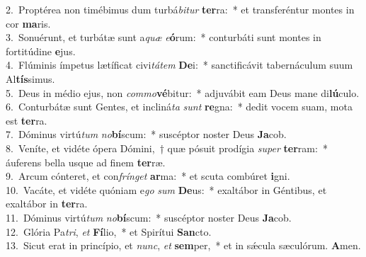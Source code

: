 {2.~}Proptérea non timébimus dum turbá\textit{bi}\textit{tur} \textbf{ter}ra:~* et transferéntur montes in cor \textbf{ma}ris.\\
{3.~}Sonuérunt, et turbátæ sunt a\textit{quæ} \textit{e}\textbf{ó}rum:~* conturbáti sunt montes in fortitúdine \textbf{e}jus.\\
{4.~}Flúminis ímpetus lætíficat civi\textit{tá}\textit{tem} \textbf{De}i:~* sanctificávit tabernáculum suum Al\textbf{tís}simus.\\
{5.~}Deus in médio ejus, non \textit{com}\textit{mo}\textbf{vé}bitur:~* adjuvábit eam Deus mane di\textbf{lú}culo.\\
{6.~}Conturbátæ sunt Gentes, et incliná\textit{ta} \textit{sunt} \textbf{re}gna:~* dedit vocem suam, mota est \textbf{ter}ra.\\
{7.~}Dóminus virtú\textit{tum} \textit{no}\textbf{bí}scum:~* suscéptor noster Deus \textbf{Ja}cob.\\
{8.~}Veníte, et vidéte ópera Dómini,~† quæ pósuit prodígia \textit{su}\textit{per} \textbf{ter}ram:~* áuferens bella usque ad finem \textbf{ter}ræ.\\
{9.~}Arcum cónteret, et con\textit{frín}\textit{get} \textbf{ar}ma:~* et scuta combúret \textbf{i}gni.\\
{10.~}Vacáte, et vidéte quóniam e\textit{go} \textit{sum} \textbf{De}us:~* exaltábor in Géntibus, et exaltábor in \textbf{ter}ra.\\
{11.~}Dóminus virtú\textit{tum} \textit{no}\textbf{bí}scum:~* suscéptor noster Deus \textbf{Ja}cob.\\
{12.~}Glória Pa\textit{tri}, \textit{et} \textbf{Fí}lio,~* et Spirítui \textbf{San}cto.\\
{13.~}Sicut erat in princípio, et \textit{nunc}, \textit{et} \textbf{sem}per,~* et in sǽcula sæculórum. \textbf{A}men.\\
